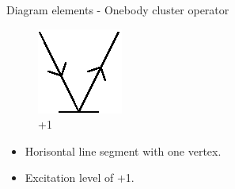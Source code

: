 \begin{frame}{Diagram elements - Onebody cluster operator}

    \renewcommand{\figurename}{Level}

    \begin{figure}
    \centering
    \parbox{0.20\textwidth}{
            \centering
            \includegraphics[scale=0.65]{graphics/t1}
            \caption{+1}
        }
    \end{figure}

    \begin{itemize}
        \item Horisontal line segment with one vertex.
        \item Excitation level of +1.
    \end{itemize}
\end{frame}

    
